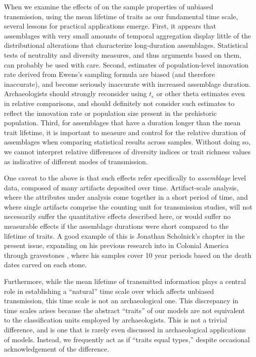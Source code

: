 When we examine the effects of \timeav on the sample properties of unbiased transmission, using the mean lifetime of traits as our fundamental time scale, several lessons for practical applications emerge.  First, it appears that assemblages with very small amounts of temporal aggregation display little of the distributional alterations that characterize long-duration assemblages.  Statistical tests of neutrality and diversity measures, and thus arguments based on them, can probably be used with care.   Second, estimates of population-level innovation rate derived from Ewens's sampling formula are biased (and therefore inaccurate), and become seriously inaccurate with increased assemblage duration.  Archaeologists should strongly reconsider using $t_e$ or other theta estimates even in relative comparisons, and should definitely not consider such estimates to reflect the innovation rate or population size present in the prehistoric population.  Third, for assemblages that have a duration longer than the mean trait lifetime, it is important to measure and control for the relative duration of assemblages when comparing statistical results across samples.  Without doing so, we cannot interpret relative differences of diversity indices or trait richness values as indicative of different modes of transmission.  

One caveat to the above is that such effects refer specifically to \emph{assemblage} level data, composed of many artifacts deposited over time.  Artifact-scale analysis, where the attributes under analysis come together in a short period of time, and where single artifacts comprise the counting unit for transmission studies, will not necessarily suffer the quantitative effects described here, or would suffer no measurable \timeav effects if the assemblage durations were short compared to the lifetime of traits.  A good example of this is Jonathan Scholnick's chapter in the present issue, expanding on his previous research into \ct in Colonial America through gravestones \citep{premo2011spatial,scholnick2010apprenticeship}, where his samples cover 10 year periods based on the death dates carved on each stone.  

Furthermore, while the mean lifetime of transmitted information plays a central role in establishing a ``natural'' time scale over which \timeav affects  unbiased transmission, this time scale is not an archaeological one.  This discrepancy in time scales arises because the abstract ``traits'' of our models are not equivalent to the classification units employed by archaeologists.  This is not a trivial difference, and is one that is rarely even discussed in archaeological applications of \ct models.  Instead, we frequently act as if  ``traits equal types,'' despite occasional acknowledgement of the difference. 

